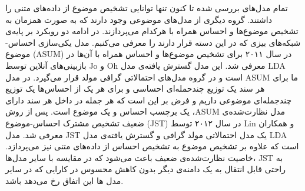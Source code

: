 \documentclass[12pt,a4paper]{article}
\begin{document}
تمام مدل‌های بررسی‌ شده تا کنون تنها توانایی تشخیص موضوع از داده‌های متنی را داشتند. گروه دیگری از مدل‌های موضوعی وجود دارند که به صورت همزمان به تشخیص موضوع‌ها و احساس همراه با هرکدام می‌‌پردازند. در ادامه دو روبکرد بر پایه‌ی شبکه‌های بیزی که در این دسته قرار دارند را معرفی می‌کنبم. مدل یکی‌سازی احساس-موضوع (ASUM) در سال ۲۰۱۱ برای تشخیص موضوع‌ها و احساس همراه با آن‌ها در بازبینی‌های آنلاین توسط Jo و Oh معرفی‌ شد. این مدل گسترش یافته‌ی مدل LDA است و در گروه مدل‌های احتمالاتی گرافی‌ مولد قرار می‌‌گیرد. 
در مدل ASUM ما برای هر سند یک توزیع چندحمله‌ای احساسی‌ و برای هر یک از احساس‌ها یک توزیع چندجمله‌ای موضوعی داریم و فرض بر این است که هر جمله در داخل هر سند دارای یک برچسب احساس و یک موضوع است. پس از روش ،ASUM مدل نظارت‌شده‌ی ضعیف تشخیص مشترک 
احساس-موضوع (JST) در سال ۲۰۱۲ توسط Lin و همکاران معرفی‌ شد. مدل JST یک مدل احتمالاتی مولد گرافی و گسترش یافته‌ی‌ مدل LDA است که علاوه بر تشخیص موضوع به تشخیص احساس از داده‌های متنی نیز می‌پردازد. خاصیت نظارت‌شده‌ی ضعیف باعث می‌‌شود که در مقایسه با سایر مدل‌ها، JST به راحتی‌ قابل انتقال به یک دامنه‌ی دیگر بدون کاهش محسوس در کارایی که در سایر مدل ها این اتفاق رخ می‌‌دهد باشد. 
\end{document}
